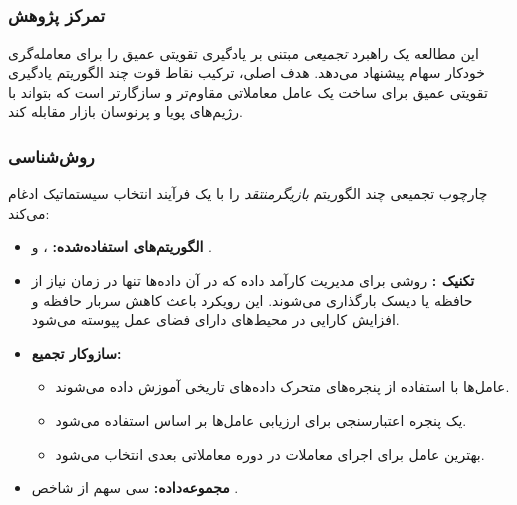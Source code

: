 \documentclass[12pt, a4paper]{report}
\begin{document}
\subsection{ \cite{yang2020ensemble}}

\subsubsection{تمرکز پژوهش}
این مطالعه یک راهبرد \textit{تجمیعی} مبتنی بر یادگیری تقویتی عمیق را برای معامله‌گری خودکار سهام پیشنهاد می‌دهد. هدف اصلی، ترکیب نقاط قوت چند الگوریتم یادگیری تقویتی عمیق برای ساخت یک عامل معاملاتی مقاوم‌تر و سازگارتر است که بتواند با رژیم‌های پویا و پرنوسان بازار مقابله کند.

\subsubsection{روش‌شناسی}
چارچوب تجمیعی چند الگوریتم \textit{بازیگر\lr{-}منتقد} را با یک فرآیند انتخاب سیستماتیک ادغام می‌کند:
\begin{itemize}

    \item \textbf{الگوریتم‌های استفاده‌شده:} ،  و .  
    \item \textbf{تکنیک :} روشی برای مدیریت کارآمد داده که در آن داده‌ها تنها در زمان نیاز از حافظه یا دیسک بارگذاری می‌شوند. این رویکرد باعث کاهش سربار حافظه و افزایش کارایی در محیط‌های دارای فضای عمل پیوسته می‌شود.  

    \item \textbf{سازوکار تجمیع:}  
    \begin{itemize}
        \item عامل‌ها با استفاده از پنجره‌های متحرک داده‌های تاریخی آموزش داده می‌شوند.  
        \item یک پنجره اعتبارسنجی برای ارزیابی عامل‌ها بر اساس   استفاده می‌شود.  
        \item بهترین عامل برای اجرای معاملات در دوره معاملاتی بعدی انتخاب می‌شود.  
    \end{itemize}
    \item \textbf{مجموعه‌داده:} سی سهم از شاخص .  
\end{itemize}
\end{document}
